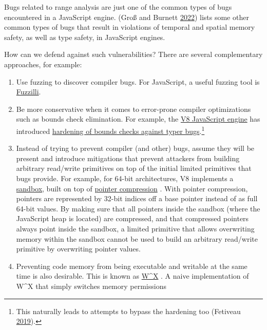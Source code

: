 \documentclass[a4paper,]{report}
\providecommand{\tightlist}{%
  \setlength{\itemsep}{0pt}\setlength{\parskip}{0pt}}
\begin{document}
Bugs related to range analysis are just one of the common types of bugs
encountered in a JavaScript engine. (Groß and Burnett
\protect\hyperlink{ref-Grouxdf2022}{2022}) lists some other common types
of bugs that result in violations of temporal and spatial memory safety,
as well as type safety, in JavaScript engines.

How can we defend against such vulnerabilities? There are several
complementary approaches, for example:

\begin{enumerate}
\def\labelenumi{\arabic{enumi}.}
\tightlist
\item
  Use fuzzing to discover compiler bugs. For JavaScript, a useful
  fuzzing tool is
  \href{https://github.com/googleprojectzero/fuzzilli}{Fuzzilli}.
\item
  Be more conservative when it comes to error-prone compiler
  optimizations such as bounds check elimination. For example, the
  \href{https://v8.dev/}{V8 JavaScript engine} has introduced
  \href{https://bugs.chromium.org/p/v8/issues/detail?id=8806}{hardening
  of bounds checks against typer bugs}.\footnote{This naturally leads to
    attempts to bypass the hardening too (Fetiveau
    \protect\hyperlink{ref-Fetiveau2019}{2019}).}
\item
  Instead of trying to prevent compiler (and other) bugs, assume they
  will be present and introduce mitigations that prevent attackers from
  building arbitrary read/write primitives on top of the initial limited
  primitives that bugs provide. For example, for 64-bit architectures,
  V8 implements a
  \href{https://docs.google.com/document/d/1FM4fQmIhEqPG8uGp5o9A-mnPB5BOeScZYpkHjo0KKA8/edit}{sandbox},
  built on top of \href{https://v8.dev/blog/pointer-compression}{pointer
  compression} . With pointer compression,
  pointers are represented by 32-bit indices off a base pointer instead
  of as full 64-bit values. By making sure that all pointers inside the
  sandbox (where the JavaScript heap is located) are compressed, and
  that compressed pointers always point inside the sandbox, a limited
  primitive that allows overwriting memory within the sandbox cannot be
  used to build an arbitrary read/write primitive by overwriting pointer
  values.
\item
  Preventing code memory from being executable and writable at the same
  time is also desirable. This is known as
  \href{https://en.wikipedia.org/wiki/W\%5EX}{W\^{}X} . A
  naive implementation of W\^{}X that simply switches memory permissions

\end{enumerate}
\end{document}
